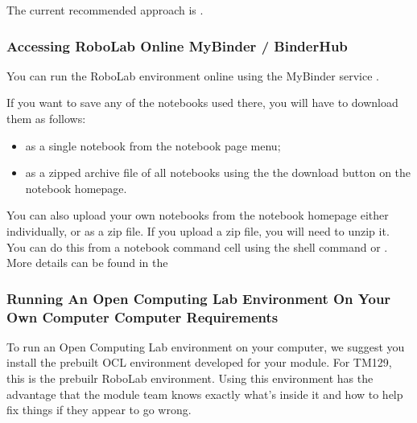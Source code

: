 \documentclass[letterpaper,10pt,english]{sphinxmanual}
\begin{document}
The current recommended approach is .


\subsubsection{Accessing RoboLab Online \sphinxhyphen{} MyBinder / BinderHub}
\label{\detokenize{content/00_READ_ME_FIRST/Section_00_05_Accessing_RoboLab:Accessing-RoboLab-Online---MyBinder-/-BinderHub}}
You can run the RoboLab environment online using the MyBinder service .

If you want to save any of the notebooks used there, you will have to download them as follows:
\begin{itemize}
\item {} 
as a single notebook from the notebook page  menu;

\item {} 
as a zipped archive file of all notebooks using the the download button on the notebook homepage.

\end{itemize}

You can also upload your own notebooks from the notebook homepage either individually, or as a zip file. If you upload a zip file, you will need to unzip it. You can do this from a notebook command cell using the  shell command or . More details can be found in the 


\subsubsection{Running An Open Computing Lab Environment On Your Own Computer \sphinxhyphen{} Computer Requirements}
\label{\detokenize{content/00_READ_ME_FIRST/Section_00_05_Accessing_RoboLab:Running-An-Open-Computing-Lab-Environment-On-Your-Own-Computer---Computer-Requirements}}
To run an Open Computing Lab environment on your computer, we suggest you install the prebuilt OCL environment developed for your module. For TM129, this is the prebuilr RoboLab environment. Using this environment has the advantage that the module team knows exactly what’s inside it and how to help fix things if they appear to go wrong.
\end{document}
